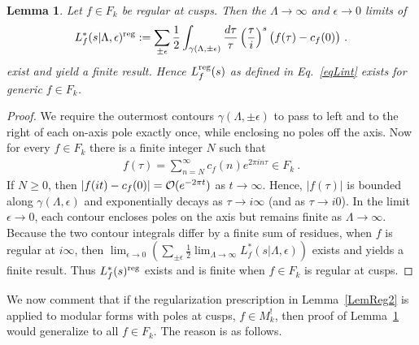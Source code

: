 \documentclass[11pt,a4paper]{article}
\newcommand{\g}{\gamma}
\newcommand{\e}{\epsilon}
\newcommand{\La}{\Lambda}
\newtheorem{lem}[thm]{Lemma}
\newcommand{\reg}{{\rm reg}}
\begin{document}
\begin{lem}\label{LemReg4}
Let $f \in F_k$ be regular at cusps. Then the $\La \to \infty$ and $\e \to 0$ limits of
\begin{align}
L_f^*(s|\Lambda,\e)^\reg := \sum_{\pm \e} \frac{1}{2}\int_{\g\left(\Lambda,\pm\e\right)} \frac{d\tau}{\tau} 
\left( \frac{\tau}{i}\right)^s 
\big(f(\tau)-c_f(0)\big)~.\label{eqLemReg4}
\end{align}
exist and yield a finite result. Hence $L_f^\reg(s)$ as defined in Eq.~\eqref{eqLint} exists for generic $f \in F_k$.  
\end{lem}

\begin{proof}
We require the outermost contours $\g(\La,\pm\e)$ to pass to left and to the right of each on-axis pole exactly once, while enclosing no poles off the axis. %
Now for every $f \in F_k$ there is a finite integer $N$ such that
\begin{align}
f(\tau) = \sum_{n = N}^{\infty} c_f(n) e^{2 \pi i n \tau} \in F_k~.
\end{align}
If $N \geq 0$, then $|f(it) -c_f(0)| = {\cal O}(e^{-2 \pi t})$ as $t \to \infty$. Hence, $|f(\tau)|$ is bounded along $\g(\La,\e)$ and exponentially decays as $\tau \to i \infty$ (and as $\tau \to i 0$). In the limit $\e \to 0$, each contour encloses poles on the axis but remains finite as $\La \to \infty$.  Because the two contour integrals differ by a finite sum of residues, when $f$ is regular at $i \infty$, then $\lim_{\e \to 0} (\sum_{\pm \e} \tfrac12 \lim_{\La \to \infty} L_f^*(s|\La,\e))$ exists and yields a finite result. Thus $L_f^*(s)^\reg$ exists and is finite when $f \in F_k$ is regular at cusps. 
\end{proof}

We now comment that if the regularization prescription in Lemma~\ref{LemReg2} is applied to modular forms with poles at cusps, $f\in M_k^!$, then proof of Lemma~\ref{LemReg4} would generalize to all $f \in F_k$. The reason is as follows. 
\end{document}
